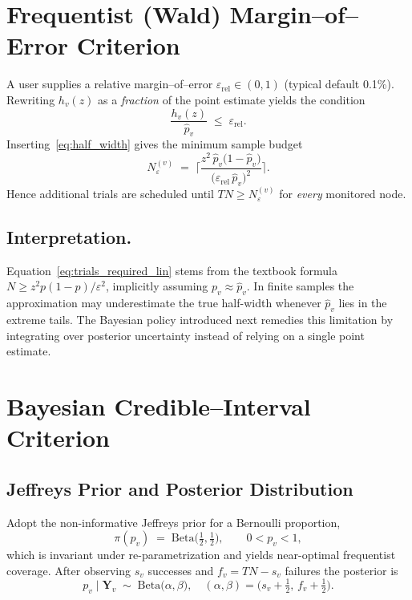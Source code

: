\section{Frequentist (Wald) Margin--of--Error Criterion}
\label{subsec:lin_margin}

A user supplies a relative margin--of--error $\varepsilon_{\mathrm{rel}}\!\in\!(0,1)$
(typical default 0.1\%).  Rewriting $h_v(z)$ as a \emph{fraction} of the point
estimate yields the condition
\begin{equation}
  \frac{h_v(z)}{\widehat{p}_v} \;\le\; \varepsilon_{\mathrm{rel}}.
  \label{eq:lin_conv}
\end{equation}
Inserting~\eqref{eq:half_width} gives the minimum sample budget
\begin{equation}
  N_{\varepsilon}^{(v)}
  \;=\;
  \biggl\lceil
    \frac{z^{2}\,\widehat{p}_v\bigl(1-\widehat{p}_v\bigr)}
         {\bigl(\varepsilon_{\mathrm{rel}}\,\widehat{p}_v\bigr)^{2}}
  \biggr\rceil.
  \label{eq:trials_required_lin}
\end{equation}
Hence additional trials are scheduled until $T N\ge N_{\varepsilon}^{(v)}$ for
\emph{every} monitored node.

\subsection*{Interpretation.} Equation~\eqref{eq:trials_required_lin} stems from the textbook formula $N\ge z^{2}p(1-p)/\varepsilon^{2}$, implicitly assuming $p_v \approx \widehat{p}_v$. In finite samples the approximation may underestimate the true half-width whenever $\widehat{p}_v$ lies in the extreme tails. The Bayesian policy introduced next remedies this limitation by integrating over posterior uncertainty instead of relying on a single point estimate.

\section{Bayesian Credible--Interval Criterion}
\label{subsec:bayes_margin}

\subsection{Jeffreys Prior and Posterior Distribution}

Adopt the non-informative Jeffreys prior for a Bernoulli proportion,
\[
  \pi(p_v) \;=\; \mathrm{Beta}\!\bigl(\tfrac12,\tfrac12\bigr),
  \qquad 0 < p_v < 1,
\]
which is invariant under re-parametrization and yields near-optimal frequentist coverage.  After observing $s_v$ successes and $f_v=T N-s_v$ failures the posterior is
\[
  p_v \mid \mathbf{Y}_v \;\sim\; \mathrm{Beta}\!\bigl(\alpha,\beta\bigr),
  \quad (\alpha,\beta)=\bigl(s_v+\tfrac12,\,f_v+\tfrac12\bigr).
\]

